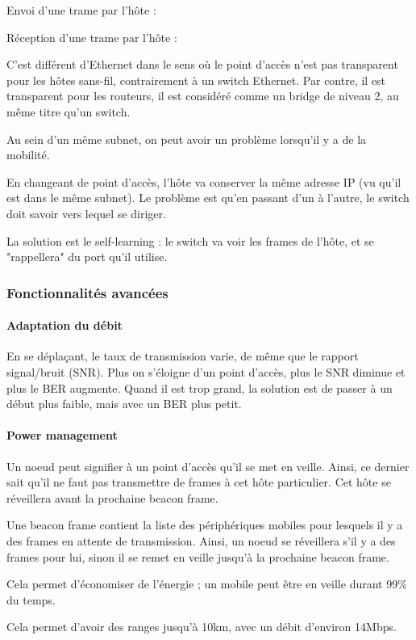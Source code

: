 		
		Envoi d'une trame par l'hôte :
		
		
		Réception d'une trame par l'hôte :
		
		
		C'est différent d'Ethernet dans le sens où le point d'accès n'est pas transparent pour les hôtes sans-fil, contrairement à un switch Ethernet. Par contre, il est transparent pour les routeurs, il est considéré comme un bridge de niveau 2, au même titre qu'un switch.
		
		Au sein d'un même subnet, on peut avoir un problème lorsqu'il y a de la mobilité.
		
				
		En changeant de point d'accès, l'hôte va conserver la même adresse IP (vu qu'il est dans le même subnet). Le problème est qu'en passant d'un à l'autre, le switch doit savoir vers lequel se diriger.
		
		La solution est le self-learning : le switch va voir les frames de l'hôte, et se "rappellera" du port qu'il utilise.
		
			\subsubsection{Fonctionnalités avancées}
		
			\paragraph{Adaptation du débit}
			En se déplaçant, le taux de transmission varie, de même que le rapport signal/bruit (SNR). Plus on s'éloigne d'un point d'accès, plus le SNR diminue et plus le BER augmente. Quand il est trop grand, la solution est de passer à un début plus faible, mais avec un BER plus petit.
		
		
			\paragraph{Power management}
		
			Un noeud peut signifier à un point d'accès qu'il se met en veille. Ainsi, ce dernier sait qu'il ne faut pas transmettre de frames à cet hôte particulier. Cet hôte se réveillera avant la prochaine beacon frame.
		
			Une beacon frame contient la liste des périphériques mobiles pour lesquels il y a des frames en attente de transmission. Ainsi, un noeud se réveillera s'il y a des frames pour lui, sinon il se remet en veille jusqu'à la prochaine beacon frame.
		
			Cela permet d'économiser de l'énergie ; un mobile peut être en veille durant 99\% du temps.
		
				
		Cela permet d'avoir des ranges jusqu'à 10km, avec un débit d'environ 14Mbps.
	